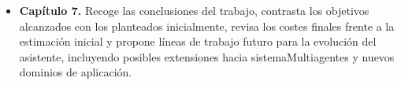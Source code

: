 \begin{itemize}
    \item \textbf{Capítulo 7.} Recoge las conclusiones del trabajo, contrasta los objetivos alcanzados con los planteados inicialmente, revisa los costes finales frente a la estimación inicial y propone líneas de trabajo futuro para la evolución del asistente, incluyendo posibles extensiones hacia \glspl{sistemaMultiagente} y nuevos dominios de aplicación.
\end{itemize}
